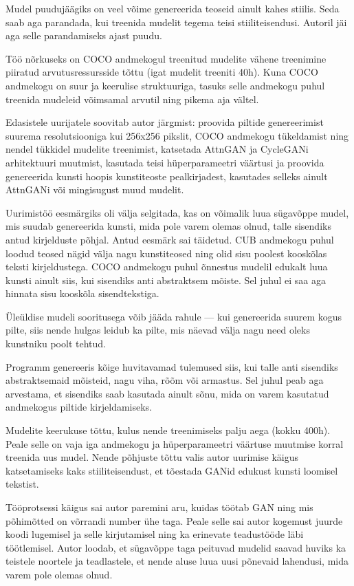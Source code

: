 \documentclass{vilgym}
\begin{document}
	Mudel puudujäägiks on veel võime genereerida teoseid ainult kahes stiilis. Seda saab aga parandada, kui treenida mudelit tegema teisi stiiliteisendusi. Autoril jäi aga selle parandamiseks ajast puudu.

	Töö nõrkuseks on COCO andmekogul treenitud mudelite vähene treenimine piiratud arvutusressursside tõttu (igat mudelit treeniti 40h). Kuna COCO andmekogu on suur ja keerulise struktuuriga, tasuks selle andmekogu puhul treenida mudeleid võimsamal arvutil ning pikema aja vältel.

	Edasistele uurijatele soovitab autor järgmist: proovida piltide genereerimist suurema resolutsiooniga kui 256x256 pikslit, COCO andmekogu tükeldamist ning nendel tükkidel mudelite treenimist, katsetada AttnGAN ja CycleGANi arhitektuuri muutmist, kasutada teisi hüperparameetri väärtusi ja proovida genereerida kunsti hoopis kunstiteoste pealkirjadest, kasutades selleks ainult AttnGANi või mingisugust muud mudelit.
	
	Uurimistöö eesmärgiks oli välja selgitada, kas on võimalik luua sügavõppe mudel, mis suudab genereerida kunsti, mida pole varem olemas olnud, talle sisendiks antud kirjelduste põhjal. Antud eesmärk sai täidetud. CUB andmekogu puhul loodud teosed nägid välja nagu kunstiteosed ning olid sisu poolest kooskõlas teksti kirjeldustega. COCO andmekogu puhul õnnestus mudelil edukalt luua kunsti ainult siis, kui sisendiks anti abstraktsem mõiste. Sel juhul ei saa aga hinnata sisu kooskõla sisendtekstiga.

	Üleüldise mudeli sooritusega võib jääda rahule --- kui genereerida suurem kogus pilte, siis nende hulgas leidub ka pilte, mis näevad välja nagu need oleks kunstniku poolt tehtud. 

	Programm genereeris kõige huvitavamad tulemused siis, kui talle anti sisendiks abstraktsemaid mõisteid, nagu viha, rõõm või armastus. Sel juhul peab aga arvestama, et sisendiks saab kasutada ainult sõnu, mida on varem kasutatud andmekogus piltide kirjeldamiseks.
	
	Mudelite keerukuse tõttu, kulus nende treenimiseks palju aega (kokku 400h). Peale selle on vaja iga andmekogu ja hüperparameetri väärtuse muutmise korral treenida uus mudel. Nende põhjuste tõttu valis autor uurimise käigus katsetamiseks kaks stiiliteisendust, et tõestada GANid edukust kunsti loomisel tekstist.
	
	Tööprotsessi käigus sai autor paremini aru, kuidas töötab GAN ning mis põhimõtted on võrrandi number ühe taga. Peale selle sai autor kogemust juurde koodi lugemisel ja selle kirjutamisel ning ka erinevate teadustööde läbi töötlemisel. Autor loodab, et sügavõppe taga peituvad mudelid saavad huviks ka teistele noortele ja teadlastele, et nende aluse luua uusi põnevaid lahendusi, mida varem pole olemas olnud.
\end{document}
